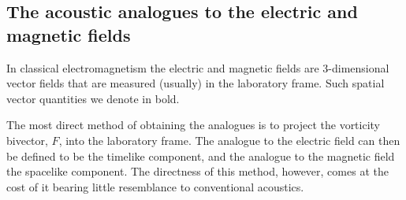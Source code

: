 \documentclass[10pt, fleqn,final,showtrims,oldfontcommands]{article} %
\newcommand{\secref}[1]{section~\ref{sec:#1}}
\newcommand{\g}{\gamma_0}
\newcommand{\nlist}[1]
	   {  
	     \begin{enumerate}
	       #1
	     \end{enumerate} 
	   }
\begin{document}







\subsection{The acoustic analogues to the electric and magnetic fields}\label{sec:int:EM}

In classical electromagnetism the electric and magnetic fields are 
3-dimensional vector fields that are measured (usually) in the laboratory frame.
Such spatial vector quantities we denote in bold.

The most direct method of obtaining the analogues  is to project the vorticity bivector, $F$, into the laboratory  frame\cite{Hestenes2003, Doran2003}.
The analogue to the electric field can then be defined to be the timelike component, and the analogue to the magnetic field the spacelike component.
The directness of this method, however, comes at the cost of it bearing little  resemblance to conventional acoustics.
\end{document}
